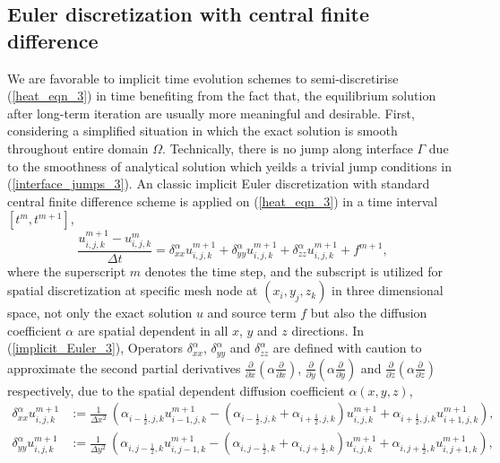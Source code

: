 \documentclass[dissertation]{uathesis}
\begin{document}
\begin{body}
\subsection{Euler discretization with central finite difference}
We are favorable to implicit time evolution schemes to semi-discretirise (\ref{heat_eqn_3}) in time benefiting from the fact that, the equilibrium solution after long-term iteration are usually more meaningful and desirable. First, considering a simplified situation in which the exact solution is smooth throughout entire domain $\Omega$. Technically, there is no jump along interface $\Gamma$ due to the smoothness of analytical solution which yeilds a trivial jump conditions in (\ref{interface_jumps_3}). An classic implicit Euler discretization with standard central finite difference scheme is applied on (\ref{heat_eqn_3}) in a time interval $[t^{m}, t^{m+1}]$,
%
\begin{equation} \label{implicit_Euler_3}
\frac{u^{m+1}_{i,j,k}-u^{m}_{i,j,k}}{\Delta t} = 
\delta_{xx}^{\alpha} u^{m+1}_{i,j,k} + 
\delta_{yy}^{\alpha} u^{m+1}_{i,j,k} + 
\delta_{zz}^{\alpha} u^{m+1}_{i,j,k} + f^{m+1}, 
\end{equation}
%
where the superscript $m$ denotes the time step, and the subscript is utilized for spatial discretization at specific mesh node at $(x_i, y_j, z_k)$ in three dimensional space, not only the exact solution $u$ and source term $f$ but also the diffusion coefficient $\alpha$ are spatial dependent in all $x$, $y$ and $z$ directions. In (\ref{implicit_Euler_3}), Operators $\delta_{xx}^{\alpha}$, $\delta_{yy}^{\alpha}$ and $\delta_{zz}^{\alpha}$ are defined with caution to approximate the second partial derivatives $\frac{\partial}{\partial x}(\alpha \frac{\partial} {\partial x})$, $\frac{\partial}{\partial y}(\alpha \frac{\partial} {\partial y})$ and $\frac{\partial}{\partial z}(\alpha \frac{\partial} {\partial z})$ respectively, due to the spatial dependent diffusion coefficient $\alpha(x,y,z)$,
%
\begin{eqnarray} \label{delta_xx_3}
\delta_{xx}^{\alpha} u^{m+1}_{i,j,k} &:=  
\frac{1}{\Delta x^{2}} ~ (\alpha_{i-\frac{1}{2},j,k} u^{m+1}_{i-1,j,k} - (\alpha_{i-\frac{1}{2},j,k} + \alpha_{i+\frac{1}{2},j,k}) u^{m+1}_{i,j,k} + \alpha_{i+\frac{1}{2},j,k} u^{m+1}_{i+1,j,k}), \nonumber \\
\delta_{yy}^{\alpha} u^{m+1}_{i,j,k} &:= 
\frac{1}{\Delta y^{2}} ~ (\alpha_{i,j-\frac{1}{2},k} u^{m+1}_{i,j-1,k} - (\alpha_{i,j-\frac{1}{2},k} + \alpha_{i,j+\frac{1}{2},k}) u^{m+1}_{i,j,k} + \alpha_{i,j+\frac{1}{2},k} u^{m+1}_{i,j+1,k}), \\

\end{eqnarray}
\end{body}
\end{document}
